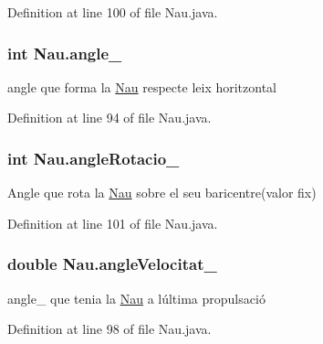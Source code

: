Definition at line 100 of file Nau.\+java.

\hypertarget{class_nau_a7bdee12f00bd2087872ff3018144799e}{}
\subsubsection[{angle\+\_\+}]{\setlength{\rightskip}{0pt plus 5cm}int Nau.\+angle\+\_\+\hspace{0.3cm}{\ttfamily [protected]}}\label{class_nau_a7bdee12f00bd2087872ff3018144799e}


angle que forma la \hyperlink{class_nau}{Nau} respecte l\textquotesingle{}eix horitzontal 



Definition at line 94 of file Nau.\+java.

\hypertarget{class_nau_a4a3defe435bcea8864ff9025c740695a}{}
\subsubsection[{angle\+Rotacio\+\_\+}]{\setlength{\rightskip}{0pt plus 5cm}int Nau.\+angle\+Rotacio\+\_\+\hspace{0.3cm}{\ttfamily [private]}}\label{class_nau_a4a3defe435bcea8864ff9025c740695a}


Angle que rota la \hyperlink{class_nau}{Nau} sobre el seu baricentre(valor fix) 



Definition at line 101 of file Nau.\+java.

\hypertarget{class_nau_aa2ee3693a5f2a95449e0310f34d9fad4}{}
\subsubsection[{angle\+Velocitat\+\_\+}]{\setlength{\rightskip}{0pt plus 5cm}double Nau.\+angle\+Velocitat\+\_\+\hspace{0.3cm}{\ttfamily [protected]}}\label{class_nau_aa2ee3693a5f2a95449e0310f34d9fad4}


angle\+\_\+ que tenia la \hyperlink{class_nau}{Nau} a l\textquotesingle{}última propulsació 



Definition at line 98 of file Nau.\+java.

